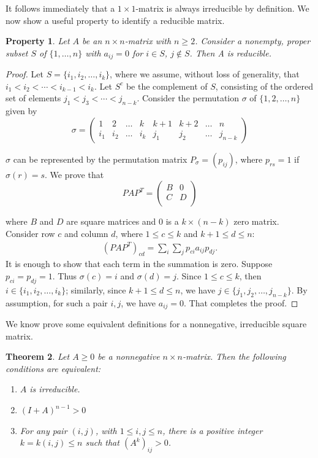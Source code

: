 \documentclass[a4paper,11pt]{report}
\newtheorem{theorem}{Theorem}[section]
\newtheorem{property}[theorem]{Property}
\begin{document}
It follows immediately that a $1\times1$-matrix is always irreducible by 
definition. We now show a useful property to identify a reducible matrix.
\begin{property}\label{propertyreducible}
  Let $A$ be an $n\times n$-matrix with $n\geq 2$. Consider a nonempty, proper subset $S$ of $\{1,\ldots,n\}$ with 
  $a_{ij}=0$ for $i \in S$, 
  $j \not\in S$. Then A is  reducible.
\end{property}
\begin{proof}
  Let $S=\{i_1, i_2,\ldots, i_k\}$, where we assume, without loss of generality, 
  that $i_1 < i_2 < \cdots < i_{k-1} < i_k$. Let $S^c$ be the complement of $S$, consisting of the
  ordered set of elements $j_1 < j_3 < \cdots < j_{n-k}$. Consider the permutation $\sigma$ of
  $\{1,2,\ldots,n\}$ given by
  $$\sigma = \begin{pmatrix} 1 & 2 & \ldots & k & k + 1 & k+ 2 & \ldots & n \\ 
  i_1 & i_2 & \ldots & i_k & j_1 & j_2 & \ldots & j_{n-k} \end{pmatrix} $$

$\sigma$ can be represented by the permutation matrix $P_\sigma = (p_{ij})$, 
where $p_{rs} = 1$ if $\sigma(r) = s$. We prove that
 $$PAP^T = \begin{pmatrix}  B  & 0\\
 C  & D\\
\end{pmatrix} $$

where $B$ and $D$ are square matrices and $0$ is a $k \times (n-k)$ zero matrix. 
Consider row $c$ and column $d$, where $1 \leq c \leq k$ and $k + 1 \leq d \leq
n$:
\begin{eqnarray}\label{redenering1}
(PAP^T)_{cd} = \sum_i\sum_j p_{c i}a_{ij}p_{d j}.
\end{eqnarray}
It is enough to show that each term in the summation is zero. Suppose $p_{c i} =
p_{d j} = 1$. Thus $\sigma(c) = i$ and $\sigma(d)= j.$ Since $1 \leq c \leq
k$, then $i \in \{i_1, i_2,\ldots, i_k\}$; similarly, since $k+1 \leq d \leq n$, we have $j \in 
\{j_1,j_2,\ldots,j_{n-k}\}.$ By assumption, for such a pair $i, j$, we have $a_{ij}=0$. That completes
the proof. 
\end{proof}
We know prove some equivalent definitions for a nonnegative, irreducible square 
matrix.
\begin{theorem}\label{irredubieleegenschappen}
  Let $A\geq 0$ be a nonnegative $n\times n$-matrix. Then the following conditions are 
  equivalent:
  \begin{enumerate}
    \item[(1)] $A$ is irreducible.
    \item[(2)] $(I + A)^{n-1} > 0$
   \item[(3)] For any pair $(i,j)$, with $1 \leq i, j \leq n$, there is a 
   positive integer $k = k(i,j) \leq n$ such that $(A^k)_{ij} > 0$.
  \end{enumerate}
\end{theorem}
\end{document}
